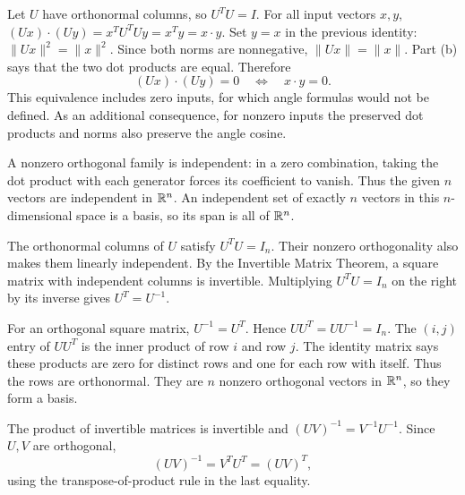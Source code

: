 Let $U$ have orthonormal columns, so $U^TU=I$.
For all input vectors $x,y$,
$(Ux)\cdot(Uy)=x^TU^TUy=x^Ty=x\cdot y$.
Set $y=x$ in the previous identity:
$\|Ux\|^2=\|x\|^2$. Since both norms are nonnegative,
$\|Ux\|=\|x\|$.
Part (b) says that the two dot products are equal. Therefore
\[
(Ux)\cdot(Uy)=0\quad\Longleftrightarrow\quad x\cdot y=0.
\]
This equivalence includes zero inputs, for which angle formulas would
not be defined. As an additional consequence, for nonzero inputs the
preserved dot products and norms also preserve the angle cosine.

A nonzero orthogonal family is independent: in a zero combination,
taking the dot product with each generator forces its coefficient to
vanish. Thus the given $n$ vectors are independent in $\mathbb{R}^n$.
An independent set of exactly $n$ vectors in this $n$-dimensional space
is a basis, so its span is all of $\mathbb{R}^n$.

The orthonormal columns of $U$ satisfy $U^TU=I_n$. Their nonzero
orthogonality also makes them linearly independent. By the Invertible
Matrix Theorem, a square matrix with independent columns is invertible.
Multiplying $U^TU=I_n$ on the right by its inverse gives $U^T=U^{-1}$.

For an orthogonal square matrix, $U^{-1}=U^T$. Hence
$UU^T=UU^{-1}=I_n$. The $(i,j)$ entry of $UU^T$ is the inner
product of row $i$ and row $j$. The identity matrix says these products
are zero for distinct rows and one for each row with itself. Thus the
rows are orthonormal. They are $n$ nonzero orthogonal vectors in
$\mathbb{R}^n$, so they form a basis.

The product of invertible matrices is invertible and
$(UV)^{-1}=V^{-1}U^{-1}$. Since $U,V$ are orthogonal,
\[
(UV)^{-1}=V^TU^T=(UV)^T,
\]
using the transpose-of-product rule in the last equality.

